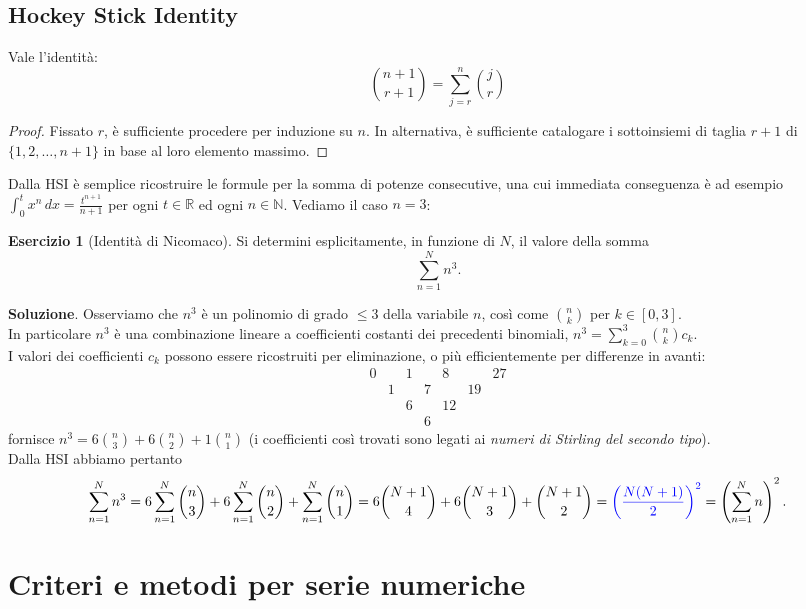 \documentclass[a4paper,twoside]{article}
\newcommand{\N}{\mathbb{N}}
\newcommand{\R}{\mathbb{R}}
\theoremstyle{definition}
\newtheorem{ex}[theorem]{Esercizio}
\numberwithin{theorem}{section}
\begin{document}
\subsection{Hockey Stick Identity}
Vale l'identità:
$$\binom{n+1}{r+1}=\sum_{j=r}^{n}\binom{j}{r}$$
\begin{proof}
 Fissato $r$, è sufficiente procedere per induzione su $n$. In alternativa, è sufficiente catalogare i sottoinsiemi di taglia $r+1$ di $\{1,2,\ldots,n+1\}$ in base al loro elemento massimo.
\end{proof}
Dalla HSI è semplice ricostruire le formule per la somma di potenze consecutive, una cui immediata conseguenza è ad esempio $\int_{0}^{t}x^n\,dx = \frac{t^{n+1}}{n+1}$ per ogni $t\in\R$ ed ogni $n\in\N$. Vediamo il caso $n=3$:
\begin{ex}[Identità di Nicomaco] Si determini esplicitamente, in funzione di $N$, il valore della somma 
$$ \sum_{n=1}^{N} n^3. $$
 
\end{ex}
\textbf{Soluzione}. Osserviamo che $n^3$ è un polinomio di grado $\leq 3$ della variabile $n$, così come $\binom{n}{k}$ per $k\in[0,3]$.\\ In particolare $n^3$ è una combinazione lineare a coefficienti costanti dei precedenti binomiali, $n^3=\sum_{k=0}^{3}\binom{n}{k}c_k$.\\
I valori dei coefficienti $c_k$ possono essere ricostruiti per eliminazione, o più efficientemente per differenze in avanti:
$$\begin{array}{ccccccc} 0 && 1 && 8 && 27 \\ 
& 1 && 7 && 19 & \\
&& 6 && 12 && \\
&&& 6 &&&
\end{array} $$
fornisce $n^3=6\binom{n}{3}+6\binom{n}{2}+1\binom{n}{1}$ (i coefficienti così trovati sono legati ai \emph{numeri di Stirling del secondo tipo}).\\ Dalla HSI abbiamo pertanto
$$ \sum_{n=1}^{N}n^3 = 6\sum_{n=1}^{N}\binom{n}{3}+6\sum_{n=1}^{N}\binom{n}{2}+\sum_{n=1}^{N}\binom{n}{1}=6\binom{N+1}{4}+6\binom{N+1}{3}+\binom{N+1}{2}={\color{blue}\left(\frac{N(N+1)}{2}\right)^2}=\left(\sum_{n=1}^{N}n\right)^2.$$

\newpage

    \section{Criteri e metodi per serie numeriche}
\end{document}
